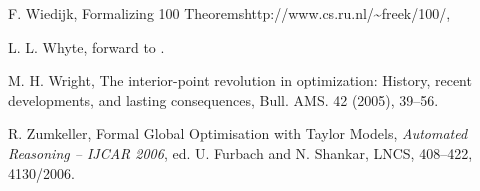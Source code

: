 \begin{thebibliography}{CHMS94}
 F. Wiedijk, Formalizing 100
Theorems\hfil\break http://www.cs.ru.nl/\~{\hbox{}}freek/100/,

 L. L. Whyte, forward to \cite{Kep66}.

 M. H. Wright, The interior-point revolution in
optimization: History, recent developments, and lasting consequences,
Bull. AMS. 42 (2005), 39--56.


  R. Zumkeller,  Formal Global Optimisation with
 Taylor Models, {\it Automated Reasoning -- IJCAR 2006},
 ed. U. Furbach and N. Shankar, LNCS, 408--422, 4130/2006.




\end{thebibliography}
